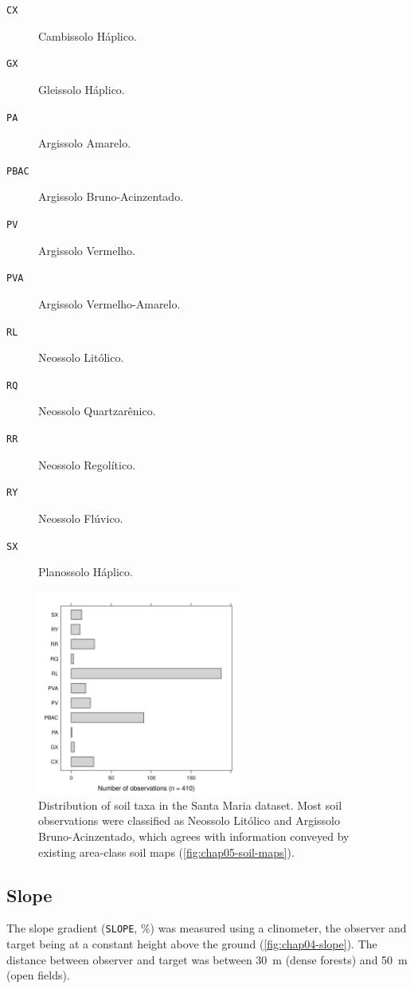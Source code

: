 \begin{description}
\item[\texttt{CX}] Cambissolo Háplico.
\item[\texttt{GX}] Gleissolo Háplico.
\item[\texttt{PA}] Argissolo Amarelo.
\item[\texttt{PBAC}] Argissolo Bruno-Acinzentado.
\item[\texttt{PV}] Argissolo Vermelho.
\item[\texttt{PVA}] Argissolo Vermelho-Amarelo.
\item[\texttt{RL}] Neossolo Litólico.
\item[\texttt{RQ}] Neossolo Quartzarênico.
\item[\texttt{RR}] Neossolo Regolítico.
\item[\texttt{RY}] Neossolo Flúvico.
\item[\texttt{SX}] Planossolo Háplico.
\end{description}

\begin{figure}[!ht]
\centering
\includegraphics[width=0.60\textwidth]{fig/chap04-taxon}
\caption[Distribution of soil taxa in the Santa Maria dataset.]{Distribution of soil taxa in the Santa Maria 
dataset. Most soil observations were classified as Neossolo Litólico and Argissolo Bruno-Acinzentado, which 
agrees with information conveyed by existing area-class soil maps (\autoref{fig:chap05-soil-maps}).}
\label{fig:chap04-taxon}
\end{figure}

\subsection{Slope}

The slope gradient (\texttt{SLOPE}, \si{\percent}) was measured using a clinometer, the observer and target 
being at a constant height above the ground (\autoref{fig:chap04-slope}). The distance between observer and 
target was between \SI{30}{\metre} (dense forests) and \SI{50}{\metre} (open fields).

